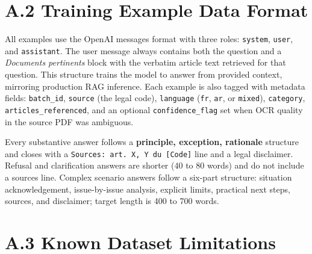 \section*{A.2 \quad Training Example Data Format}

All examples use the OpenAI messages format with three roles: \texttt{system}, \texttt{user}, and \texttt{assistant}. The user message always contains both the question and a \textit{Documents pertinents} block with the verbatim article text retrieved for that question. This structure trains the model to answer from provided context, mirroring production \ac{RAG} inference. Each example is also tagged with metadata fields: \texttt{batch\_id}, \texttt{source} (the legal code), \texttt{language} (\texttt{fr}, \texttt{ar}, or \texttt{mixed}), \texttt{category}, \texttt{articles\_referenced}, and an optional \texttt{confidence\_flag} set when \ac{OCR} quality in the source \ac{PDF} was ambiguous.

\vspace{1em}

Every substantive answer follows a \textbf{principle, exception, rationale} structure and closes with a \texttt{Sources: art. X, Y du [Code]} line and a legal disclaimer. Refusal and clarification answers are shorter (40 to 80 words) and do not include a sources line. Complex scenario answers follow a six-part structure: situation acknowledgement, issue-by-issue analysis, explicit limits, practical next steps, sources, and disclaimer; target length is 400 to 700 words.

\section*{A.3 \quad Known Dataset Limitations}


